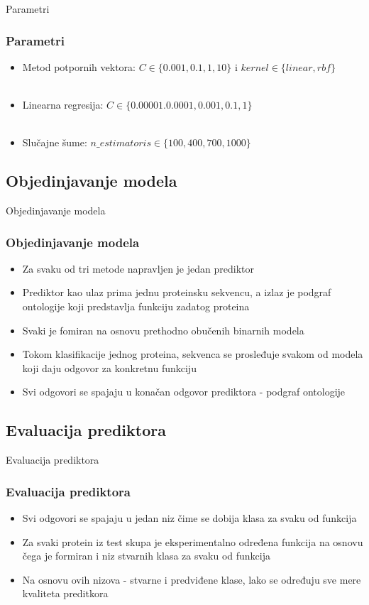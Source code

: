 \documentclass{beamer}
\begin{document}
\begin{frame}{Parametri}
	\frametitle{Parametri}
	\begin{itemize}
		\item Metod potpornih vektora: $C\in \{0.001, 0.1, 1, 10\}$ i $kernel \in \{linear, rbf\}$
		~ \\ ~ \\
		\item Linearna regresija: $C\in \{0.00001. 0.0001, 0.001, 0.1, 1\}$
		~ \\ ~ \\
		\item Slučajne šume: $n\_estimatoris \in \{100, 400, 700, 1000\}$
		
	\end{itemize}
\end{frame}


\subsection{Objedinjavanje modela}
\begin{frame}{Objedinjavanje modela}
	\frametitle{Objedinjavanje modela}
	
	\begin{itemize}
		\item Za svaku od tri metode napravljen je jedan prediktor
		
		\item Prediktor kao ulaz prima jednu proteinsku sekvencu, a izlaz je podgraf ontologije koji predstavlja funkciju zadatog proteina
		
		\item Svaki je fomiran na osnovu prethodno obučenih binarnih modela
		
		\item Tokom klasifikacije jednog proteina, sekvenca se prosleđuje svakom od modela koji daju odgovor za konkretnu funkciju
		
		\item Svi odgovori se spajaju u konačan odgovor prediktora - podgraf ontologije
	\end{itemize}
\end{frame}


\subsection{Evaluacija prediktora}
\begin{frame}{Evaluacija prediktora}
	\frametitle{Evaluacija prediktora}
	
	\begin{itemize}
		\item Svi odgovori se spajaju u jedan niz čime se dobija klasa za svaku od funkcija
		
		\item Za svaki protein iz test skupa je eksperimentalno određena funkcija na osnovu čega je formiran i niz stvarnih klasa za svaku od funkcija
		
		\item Na osnovu ovih nizova - stvarne i predviđene klase, lako se određuju sve mere kvaliteta preditkora
	\end{itemize}
\end{frame}
\end{document}
